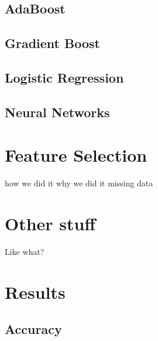 \documentclass{article}
\begin{document}
\subsection{AdaBoost}

\subsection{Gradient Boost}

\subsection{Logistic Regression}

\subsection{Neural Networks}



\section{Feature Selection}
how we did it
why we did it
  missing data


\section{Other stuff}
Like what?


\section{Results}

\subsection{Accuracy}


\end{document}
